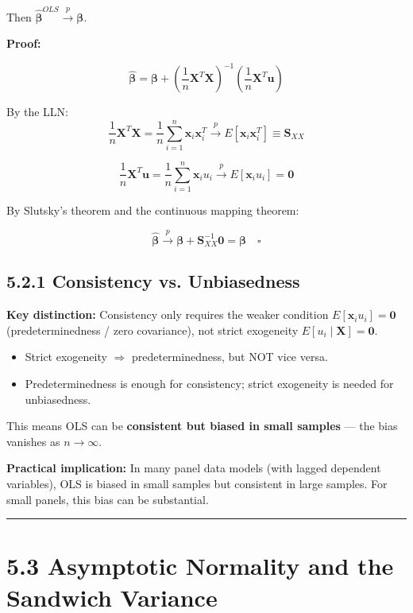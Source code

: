 Then $\hat{\boldsymbol{\beta}}^{OLS} \xrightarrow{p} \boldsymbol{\beta}$.

\textbf{Proof:}

\[
\hat{\boldsymbol{\beta}} = \boldsymbol{\beta} + \left(\frac{1}{n}\mathbf{X}^T\mathbf{X}\right)^{-1} \left(\frac{1}{n}\mathbf{X}^T\mathbf{u}\right)
\]

By the LLN:
\[
\frac{1}{n}\mathbf{X}^T\mathbf{X} = \frac{1}{n}\sum_{i=1}^n \mathbf{x}_i \mathbf{x}_i^T \xrightarrow{p} E[\mathbf{x}_i \mathbf{x}_i^T] \equiv \mathbf{S}_{XX}
\]

\[
\frac{1}{n}\mathbf{X}^T\mathbf{u} = \frac{1}{n}\sum_{i=1}^n \mathbf{x}_i u_i \xrightarrow{p} E[\mathbf{x}_i u_i] = \mathbf{0}
\]

By Slutsky's theorem and the continuous mapping theorem:

\[
\hat{\boldsymbol{\beta}} \xrightarrow{p} \boldsymbol{\beta} + \mathbf{S}_{XX}^{-1} \mathbf{0} = \boldsymbol{\beta} \quad \square
\]

\subsection{5.2.1 Consistency vs. Unbiasedness}

\textbf{Key distinction:} Consistency only requires the weaker condition $E[\mathbf{x}_i u_i] = \mathbf{0}$ (predeterminedness / zero covariance), not strict exogeneity $E[u_i \mid \mathbf{X}] = \mathbf{0}$.

\begin{itemize}
\item Strict exogeneity $\Rightarrow$ predeterminedness, but NOT vice versa.
\item Predeterminedness is enough for consistency; strict exogeneity is needed for unbiasedness.
\end{itemize}

This means OLS can be \textbf{consistent but biased in small samples} --- the bias vanishes as $n \to \infty$.

\textbf{Practical implication:} In many panel data models (with lagged dependent variables), OLS is biased in small samples but consistent in large samples. For small panels, this bias can be substantial.

\medskip\hrule\medskip

\section{5.3 Asymptotic Normality and the Sandwich Variance}

